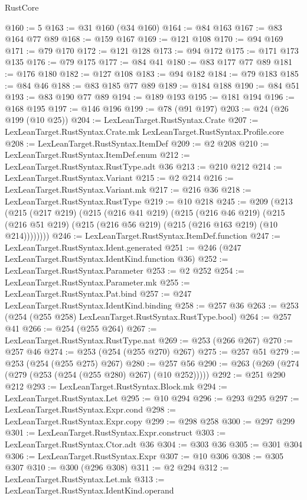 \begin{lexlean}{RustCore}
\begin{coremodule}
@160 := 5
@163 := @31 @160 (@34 @160)
@164 := @84 @163
@167 := @83 @164 @77 @89
@168 := @159 @167
@169 := @121 @108
@170 := @94 @169
@171 := @79 @170
@172 := @121 @128
@173 := @94 @172
@175 := @171 @173 @135
@176 := @79 @175
@177 := @84 @41
@180 := @83 @177 @77 @89
@181 := @176 @180
@182 := @127 @108
@183 := @94 @182
@184 := @79 @183
@185 := @84 @46
@188 := @83 @185 @77 @89
@189 := @184 @188
@190 := @84 @51
@193 := @83 @190 @77 @89
@194 := @189 @193
@195 := @181 @194
@196 := @168 @195
@197 := @146 @196
@199 := @78 (@91 @197)
@203 := @24 (@26 @199 (@10 @25))
@204 := LexLeanTarget.RustSyntax.Crate
@207 := LexLeanTarget.RustSyntax.Crate.mk LexLeanTarget.RustSyntax.Profile.core
@208 := LexLeanTarget.RustSyntax.ItemDef
@209 := @2 @208
@210 := LexLeanTarget.RustSyntax.ItemDef.enum
@212 := LexLeanTarget.RustSyntax.RustType.adt @36
@213 := @210 @212
@214 := LexLeanTarget.RustSyntax.Variant
@215 := @2 @214
@216 := LexLeanTarget.RustSyntax.Variant.mk
@217 := @216 @36
@218 := LexLeanTarget.RustSyntax.RustType
@219 := @10 @218
@245 := @209
    (@213
      (@215
        (@217 @219)
        (@215
          (@216 @41 @219)
          (@215
            (@216 @46 @219)
            (@215 (@216 @51 @219) (@215 (@216 @56 @219) (@215 (@216 @163 @219) (@10 @214))))))))
@246 := LexLeanTarget.RustSyntax.ItemDef.function
@247 := LexLeanTarget.RustSyntax.Ident.generated
@251 := @246 (@247 LexLeanTarget.RustSyntax.IdentKind.function @36)
@252 := LexLeanTarget.RustSyntax.Parameter
@253 := @2 @252
@254 := LexLeanTarget.RustSyntax.Parameter.mk
@255 := LexLeanTarget.RustSyntax.Pat.bind
@257 := @247 LexLeanTarget.RustSyntax.IdentKind.binding
@258 := @257 @36
@263 := @253 (@254 (@255 @258) LexLeanTarget.RustSyntax.RustType.bool)
@264 := @257 @41
@266 := @254 (@255 @264)
@267 := LexLeanTarget.RustSyntax.RustType.nat
@269 := @253 (@266 @267)
@270 := @257 @46
@274 := @253 (@254 (@255 @270) @267)
@275 := @257 @51
@279 := @253 (@254 (@255 @275) @267)
@280 := @257 @56
@290 := @263 (@269 (@274 (@279 (@253 (@254 (@255 @280) @267) (@10 @252)))))
@292 := @251 @290 @212
@293 := LexLeanTarget.RustSyntax.Block.mk
@294 := LexLeanTarget.RustSyntax.Let
@295 := @10 @294
@296 := @293 @295
@297 := LexLeanTarget.RustSyntax.Expr.cond
@298 := LexLeanTarget.RustSyntax.Expr.copy
@299 := @298 @258
@300 := @297 @299
@301 := LexLeanTarget.RustSyntax.Expr.construct
@303 := LexLeanTarget.RustSyntax.Ctor.adt @36
@304 := @303 @36
@305 := @301 @304
@306 := LexLeanTarget.RustSyntax.Expr
@307 := @10 @306
@308 := @305 @307
@310 := @300 (@296 @308)
@311 := @2 @294
@312 := LexLeanTarget.RustSyntax.Let.mk
@313 := LexLeanTarget.RustSyntax.IdentKind.operand

\end{coremodule}
\end{lexlean}

